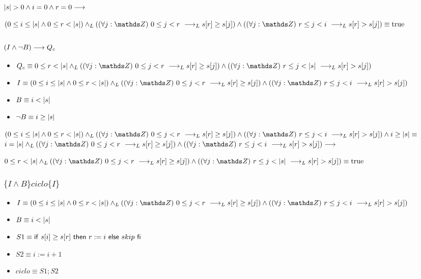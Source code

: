 \documentclass{article}
\begin{document}
$|s| > 0 \wedge i = 0 \wedge r = 0 \longrightarrow$

$(0 \leq i \leq \longitud{s} \wedge 0 \leq r < \longitud{s}) \yLuego (\paraTodo{j}{0}{r} \implicaLuego s[r] \geq s[j]) \wedge (\paraTodo{j}{r}{i}\implicaLuego s[r] > s[j]) \equiv \True$

\subsubsection*{$ (I \wedge \neg B) \longrightarrow Q_{c} $}

\begin{itemize}
    \item $Q_{c}    \equiv 0 \leq r < \longitud{s} \yLuego (\paraTodo{j}{0}{r} \implicaLuego s[r] \geq s[j]) \wedge (\paraTodo{j}{r}{\longitud{s}}\implicaLuego s[r] > s[j])$
    \item $I        \equiv (0 \leq i \leq \longitud{s} \wedge 0 \leq r < \longitud{s}) \yLuego (\paraTodo{j}{0}{r} \implicaLuego s[r] \geq s[j]) \wedge (\paraTodo{j}{r}{i}\implicaLuego s[r] > s[j])$
    \item $B        \equiv i < |s|$
    \item $\neg B   \equiv i \geq |s|$
\end{itemize}

$(0 \leq i \leq \longitud{s} \wedge 0 \leq r < \longitud{s}) \yLuego (\paraTodo{j}{0}{r} \implicaLuego s[r] \geq s[j]) \wedge (\paraTodo{j}{r}{i}\implicaLuego s[r] > s[j]) \wedge i \geq \longitud{s} \equiv$ \\

$i = \longitud{s} \yLuego (\paraTodo{j}{0}{r} \implicaLuego s[r] \geq s[j]) \wedge (\paraTodo{j}{r}{i}\implicaLuego s[r] > s[j]) \implica$

$0 \leq r < \longitud{s} \yLuego (\paraTodo{j}{0}{r} \implicaLuego s[r] \geq s[j]) \wedge (\paraTodo{j}{r}{\longitud{s}}\implicaLuego s[r] > s[j]) \equiv \True$

\subsubsection*{$ \{I \wedge B\} ciclo \{I\} $}
\begin{itemize}
    \item $I        \equiv (0 \leq i \leq \longitud{s} \wedge 0 \leq r < \longitud{s}) \yLuego (\paraTodo{j}{0}{r} \implicaLuego s[r] \geq s[j]) \wedge (\paraTodo{j}{r}{i}\implicaLuego s[r] > s[j])$
    \item $B        \equiv i < |s|$
    \item $S1       \equiv \mathsf{if}\ s[i] \geq s[r]\ \mathsf{then}\ r:= i\ \mathsf{else}\ skip\ \mathsf{fi}$
    \item $S2       \equiv i:= i + 1$
    \item $ciclo    \equiv S1; S2$
\end{itemize}
\end{document}

